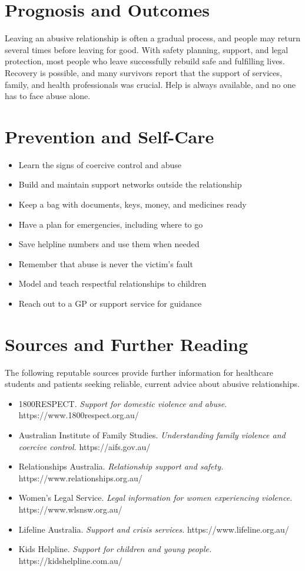 \section*{Prognosis and Outcomes}
Leaving an abusive relationship is often a gradual process, and people may return several times before leaving for good. With safety planning, support, and legal protection, most people who leave successfully rebuild safe and fulfilling lives. Recovery is possible, and many survivors report that the support of services, family, and health professionals was crucial. Help is always available, and no one has to face abuse alone.

\section*{Prevention and Self-Care}
\begin{itemize}
    \item Learn the signs of coercive control and abuse
    \item Build and maintain support networks outside the relationship
    \item Keep a bag with documents, keys, money, and medicines ready
    \item Have a plan for emergencies, including where to go
    \item Save helpline numbers and use them when needed
    \item Remember that abuse is never the victim's fault
    \item Model and teach respectful relationships to children
    \item Reach out to a GP or support service for guidance
\end{itemize}

\section*{Sources and Further Reading}
The following reputable sources provide further information for healthcare students and patients seeking reliable, current advice about abusive relationships.

\begin{itemize}
    \item 1800RESPECT. \textit{Support for domestic violence and abuse.} https://www.1800respect.org.au/
    \item Australian Institute of Family Studies. \textit{Understanding family violence and coercive control.} https://aifs.gov.au/
    \item Relationships Australia. \textit{Relationship support and safety.} https://www.relationships.org.au/
    \item Women's Legal Service. \textit{Legal information for women experiencing violence.} https://www.wlsnsw.org.au/
    \item Lifeline Australia. \textit{Support and crisis services.} https://www.lifeline.org.au/
    \item Kids Helpline. \textit{Support for children and young people.} https://kidshelpline.com.au/
\end{itemize}
